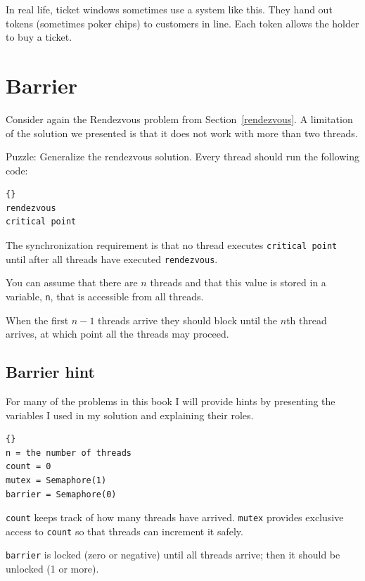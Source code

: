 \documentclass{book}
\newcommand{\clearemptydoublepage}{\newpage\cleardoublepage}
\begin{document}
In real life, ticket windows sometimes use a system like
this.  They hand out tokens (sometimes poker chips) to
customers in line.  Each token allows the holder to buy a ticket.




\section{Barrier}

Consider again the Rendezvous problem from Section~\ref{rendezvous}.
A limitation of the solution we presented is that it does
not work with more than two threads.

Puzzle: Generalize the rendezvous solution.  Every thread should
run the following code:

\begin{lstlisting}[title={Barrier code}]{}
rendezvous
critical point
\end{lstlisting}

The synchronization requirement is that
no thread executes {\tt critical point} until after all
threads have executed {\tt rendezvous}.

You can assume that there are $n$
threads and that this value is stored in a variable, {\tt n},
that is accessible from all threads.

When the first $n-1$ threads arrive they should block until the $n$th
thread arrives, at which point all the threads may proceed.


\clearemptydoublepage
\subsection {Barrier hint}

For many of the problems in this book I will provide hints
by presenting the variables I used in my solution and
explaining their roles.

\begin{lstlisting}[title={Barrier hint}]{}
n = the number of threads
count = 0
mutex = Semaphore(1)
barrier = Semaphore(0)
\end{lstlisting}

{\tt count} keeps track of how many threads have arrived.
{\tt mutex} provides exclusive access to {\tt count} so that
threads can increment it safely.

{\tt barrier} is locked
(zero or negative) until all threads arrive; then it should
be unlocked (1 or more).


\clearemptydoublepage
\end{document}
